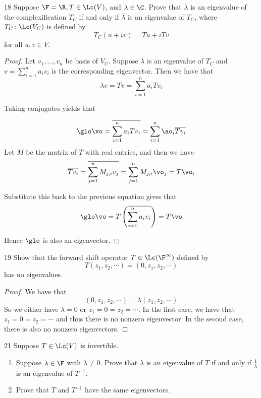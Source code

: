 \documentclass{extarticle}
\begin{document}
\begin{problem}{18}
    Suppose \(\F = \R, T \in \Lc(V)\), and \(\lambda \in \C\). Prove that \(\lambda\) is 
    an eigenvalue of the complexification \(T_C\) if and only if \(\overline{\lambda}\) 
    is an eigenvalue of \(T_C\), where \(T_C \colon \Lc(V_C)\) is defined by 
    \[T_C(u + iv) = Tu + iTv\]
    for all \(u, v \in V\).
\end{problem}

\begin{proof} Let \(v_1, \ldots, v_n\) be basis of \(V_C\).
Suppose \(\lambda\) is an eigenvalue of \(T_C\) and \(v = \sum_{i=1}^{n}a_i v_i\) is the 
corresponding eigenvector. Then we have that 
\[\lambda v = Tv = \sum_{i=1}^{n}a_i T v_i\] 

Taking conjugates yields that 

\[\glo \vo = \overline{\sum_{i=1}^{n} a_i T v_i} = \sum_{i=1}^{n} \ao_i \overline{T v_i}\]
Let \(M\) be the matrix of \(T\) with real entries, and then we have 
\[\overline{Tv_i} = \overline{\sum_{j=1}^{n}M_{j, i} v_j} = \sum_{j=1}^{n}M_{j, i} \vo_j 
= T \vo_i\]

Substitute this back to the previous equation gives that 
\[\glo \vo = T \left(\overline{\sum_{i=1}^{n} a_i v_i}\right) = T \vo \]

Hence \(\glo\) is also an eigenvector. 
\end{proof}

\begin{problem}{19}
    Show that the forward shift operator \(T \in \Lc(\F^\infty)\) defined by 
    \[T(z_1, z_2, \cdots) = (0, z_1, z_2, \cdots)\]
    has no eigenvalues. 
\end{problem}

\begin{proof}
We have that 
\[(0, z_1, z_2, \cdots) = \lambda (z_1, z_2, \cdots)\]
So we either have \(\lambda =0\) or \(z_1 = 0 = z_2 = \cdots\). In the first case, we have 
that \(z_1 = 0 = z_2 = \cdots\) and thus there is no nonzero eigenvector. In the second case, 
there is also no nonzero eigenvectors. 
\end{proof}

\begin{problem}{21}
    Suppose \(T \in \Lc(V)\) is invertible. 
    \begin{enumerate}[label=(\alph*)]
        \item Suppose \(\lambda \in \F\) with \(\lambda \neq 0\). Prove that 
        \(\lambda\) is an eigenvalue of \(T\) if and only if \(\frac{1}{\lambda}\) 
        is an eigenvalue of \(T^{-1}\). 

        \item Prove that \(T\) and \(T^{-1}\) have the same eigenvectors. 
    \end{enumerate}
\end{problem}
\end{document}
